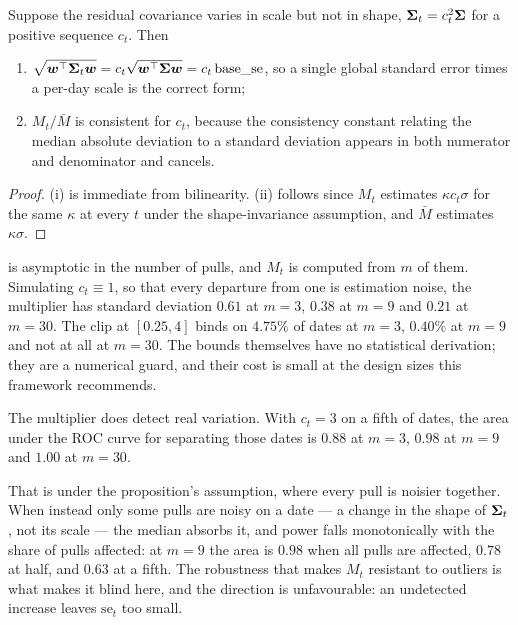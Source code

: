 \documentclass[12pt,a4paper,oneside]{article}
\begin{document}
\begin{proposition}\label{prop:localscale}
Suppose the residual covariance varies in scale but not in shape,
$\bm{\Sigma}_t=c_t^2\bm{\Sigma}$ for a positive sequence $c_t$. Then
\begin{enumerate}
\item $\sqrt{\bm{w}^{\top}\bm{\Sigma}_t\bm{w}}=c_t\sqrt{\bm{w}^{\top}\bm{\Sigma}\bm{w}}
=c_t\,\text{base\_se}$, so a single global standard error times a per-day scale is
the correct form;
\item $M_t/\bar{M}$ is consistent for $c_t$, because the consistency constant
relating the median absolute deviation to a standard deviation appears in both
numerator and denominator and cancels.
\end{enumerate}
\end{proposition}

\begin{proof}
(i) is immediate from bilinearity. (ii) follows since $M_t$ estimates
$\kappa c_t \sigma$ for the same $\kappa$ at every $t$ under the shape-invariance
assumption, and $\bar{M}$ estimates $\kappa\sigma$.
\end{proof}

\begin{remark}
 is asymptotic in the number of pulls, and $M_t$ is computed
from $m$ of them. Simulating $c_t\equiv1$, so that every departure from one is
estimation noise, the multiplier has standard deviation $0.61$ at $m=3$, $0.38$ at
$m=9$ and $0.21$ at $m=30$. The clip at $[0.25,4]$ binds on $4.75\%$ of dates at
$m=3$, $0.40\%$ at $m=9$ and not at all at $m=30$. The bounds themselves have no
statistical derivation; they are a numerical guard, and their cost is small at the
design sizes this framework recommends.
\end{remark}

\begin{remark}\label{rem:localpower}
The multiplier does detect real variation. With $c_t=3$ on a fifth of dates, the
area under the ROC curve for separating those dates is $0.88$ at $m=3$, $0.98$ at
$m=9$ and $1.00$ at $m=30$.

That is under the proposition's assumption, where every pull is noisier together.
When instead only some pulls are noisy on a date --- a change in the shape of
$\bm{\Sigma}_t$, not its scale --- the median absorbs it, and power falls monotonically
with the share of pulls affected: at $m=9$ the area is $0.98$ when all pulls are
affected, $0.78$ at half, and $0.63$ at a fifth. The robustness that makes $M_t$
resistant to outliers is what makes it blind here, and the direction is
unfavourable: an undetected increase leaves $\mathrm{se}_t$ too small.
\end{remark}
\end{document}
